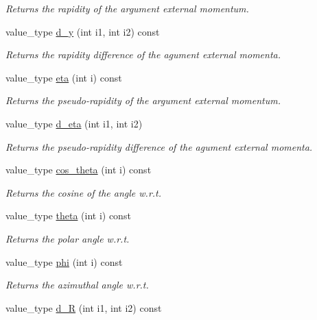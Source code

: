 \begin{DoxyCompactItemize}
\begin{DoxyCompactList}\small\item\em Returns the rapidity of the argument external momentum. \end{DoxyCompactList}\item 
\hypertarget{a00442_af629dece8285b64c61332cdb751dec82}{value\-\_\-type \hyperlink{a00442_af629dece8285b64c61332cdb751dec82}{d\-\_\-y} (int i1, int i2) const }\label{a00442_af629dece8285b64c61332cdb751dec82}

\begin{DoxyCompactList}\small\item\em Returns the rapidity difference of the agument external momenta. \end{DoxyCompactList}\item 
\hypertarget{a00442_abf2be786c051c6aa81c96a5873117f0b}{value\-\_\-type \hyperlink{a00442_abf2be786c051c6aa81c96a5873117f0b}{eta} (int i) const }\label{a00442_abf2be786c051c6aa81c96a5873117f0b}

\begin{DoxyCompactList}\small\item\em Returns the pseudo-\/rapidity of the argument external momentum. \end{DoxyCompactList}\item 
\hypertarget{a00442_ab782f447ae0600fb2734cf4bbbb054ed}{value\-\_\-type \hyperlink{a00442_ab782f447ae0600fb2734cf4bbbb054ed}{d\-\_\-eta} (int i1, int i2)}\label{a00442_ab782f447ae0600fb2734cf4bbbb054ed}

\begin{DoxyCompactList}\small\item\em Returns the pseudo-\/rapidity difference of the agument external momenta. \end{DoxyCompactList}\item 
value\-\_\-type \hyperlink{a00442_a3c250cdd85b2e8c2ccffa1ba428835b8}{cos\-\_\-theta} (int i) const 
\begin{DoxyCompactList}\small\item\em Returns the cosine of the angle w.\-r.\-t. \end{DoxyCompactList}\item 
value\-\_\-type \hyperlink{a00442_a2afb8172a5259681d1ddb6ccbaf7bf83}{theta} (int i) const 
\begin{DoxyCompactList}\small\item\em Returns the polar angle w.\-r.\-t. \end{DoxyCompactList}\item 
value\-\_\-type \hyperlink{a00442_a1cfa4357ba44653535724a0b37e6fb48}{phi} (int i) const 
\begin{DoxyCompactList}\small\item\em Returns the azimuthal angle w.\-r.\-t. \end{DoxyCompactList}\item 
\hypertarget{a00442_a9b4ba5347ce7d475525c1a217cafcf19}{value\-\_\-type \hyperlink{a00442_a9b4ba5347ce7d475525c1a217cafcf19}{d\-\_\-\-R} (int i1, int i2) const }\label{a00442_a9b4ba5347ce7d475525c1a217cafcf19}


\end{DoxyCompactItemize}
